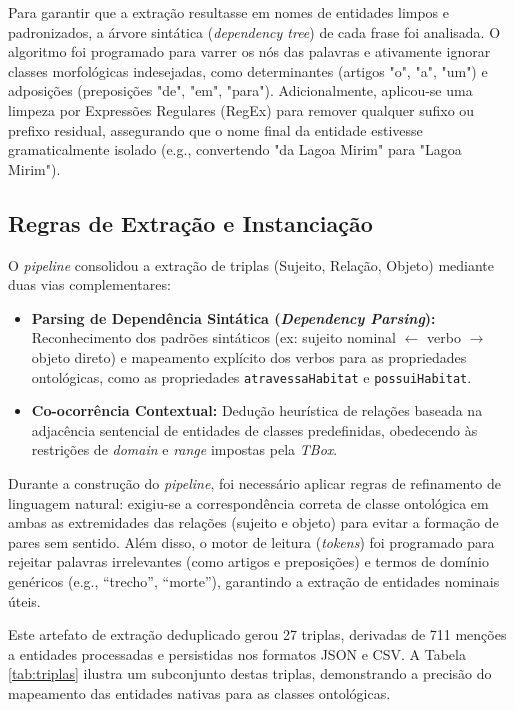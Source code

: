 \documentclass[10pt,conference]{IEEEtran}
\begin{document}
Para garantir que a extração resultasse em nomes de entidades limpos e padronizados, a árvore sintática (\textit{dependency tree}) de cada frase foi analisada. O algoritmo foi programado para varrer os nós das palavras e ativamente ignorar classes morfológicas indesejadas, como determinantes (artigos "o", "a", "um") e adposições (preposições "de", "em", "para"). Adicionalmente, aplicou-se uma limpeza por Expressões Regulares (RegEx) para remover qualquer sufixo ou prefixo residual, assegurando que o nome final da entidade estivesse gramaticalmente isolado (e.g., convertendo "da Lagoa Mirim" para "Lagoa Mirim").

\subsection{Regras de Extração e Instanciação}

O \textit{pipeline} consolidou a extração de triplas (Sujeito, Relação, Objeto) mediante duas vias complementares:
\begin{itemize}
    \item \textbf{Parsing de Dependência Sintática (\textit{Dependency Parsing}):} Reconhecimento dos padrões sintáticos (ex: sujeito nominal $\leftarrow$ verbo $\rightarrow$ objeto direto) e mapeamento explícito dos verbos para as propriedades ontológicas, como as propriedades \texttt{atravessaHabitat} e \texttt{possuiHabitat}.
    \item \textbf{Co-ocorrência Contextual:} Dedução heurística de relações baseada na adjacência sentencial de entidades de classes predefinidas, obedecendo às restrições de \textit{domain} e \textit{range} impostas pela \textit{TBox}.
\end{itemize}

Durante a construção do \textit{pipeline}, foi necessário aplicar regras de refinamento de linguagem natural: exigiu-se a correspondência correta de classe ontológica em ambas as extremidades das relações (sujeito e objeto) para evitar a formação de pares sem sentido. Além disso, o motor de leitura (\textit{tokens}) foi programado para rejeitar palavras irrelevantes (como artigos e preposições) e termos de domínio genéricos (e.g., ``trecho'', ``morte''), garantindo a extração de entidades nominais úteis.

Este artefato de extração deduplicado gerou 27 triplas, derivadas de 711 menções a entidades processadas e persistidas nos formatos JSON e CSV. A Tabela \ref{tab:triplas} ilustra um subconjunto destas triplas, demonstrando a precisão do mapeamento das entidades nativas para as classes ontológicas.
\end{document}
